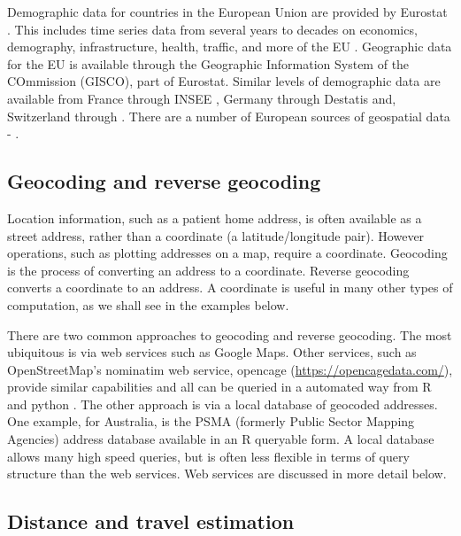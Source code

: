 \documentclass[utf8]{frontiersHLTH}
\begin{document}
Demographic data for countries in the European Union are provided by
Eurostat \cite{eurostat}. This includes time series data from several
years to decades on economics, demography, infrastructure, health,
traffic, and more of the EU \cite{Lahti2017}. Geographic data for the
EU is available through the Geographic Information System of the
COmmission (GISCO), part of Eurostat. Similar levels of demographic
data are available from France through INSEE \cite{insee}, Germany
through Destatis \cite{destatis} and, Switzerland through
\cite{swiss-bfs}. There are a number of European sources of geospatial
data - \cite{diva-gis,germany-gis,swiss-3d}.

\subsection{Geocoding and reverse
geocoding}\label{geocoding-and-reverse-geocoding}

Location information, such as a patient home address, is often available
as a street address, rather than a coordinate (a latitude/longitude
pair). However operations, such as plotting addresses on a map, require
a coordinate. Geocoding is the process of converting an address to a
coordinate. Reverse geocoding converts a coordinate to an address. A
coordinate is useful in many other types of computation, as we shall see
in the examples below.

There are two common approaches to geocoding and reverse geocoding. The
most ubiquitous is via web services such as Google Maps. Other services,
such as OpenStreetMap's nominatim web service, opencage
(\url{https://opencagedata.com/}), provide similar capabilities and all
can be queried in a automated way from R and python \cite{opencage}. The
other approach is via a local database of geocoded addresses. One
example, for Australia, is the PSMA (formerly Public Sector Mapping
Agencies) address database available in an R queryable form. A local
database allows many high speed queries, but is often less flexible in
terms of query structure than the web services. Web services are
discussed in more detail below.

\subsection{Distance and travel
estimation}\label{distance-and-travel-estimation}
\end{document}
